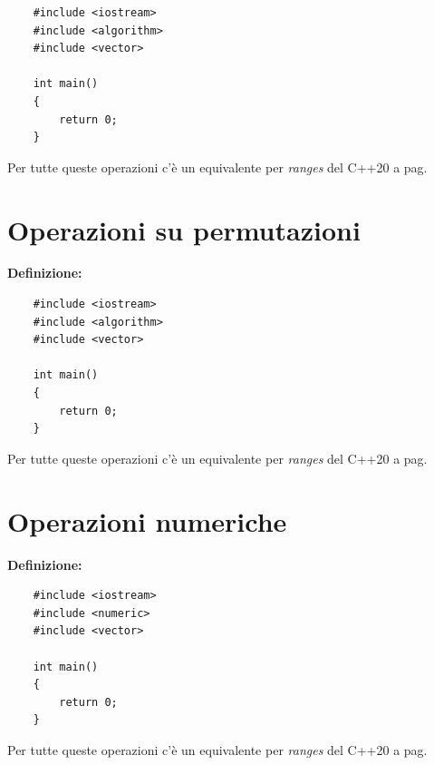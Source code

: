 \begin{lstlisting}
	#include <iostream>
	#include <algorithm>
	#include <vector>
	
	int main()
	{
		return 0;
	}
\end{lstlisting}

\fleuron

\textsf{\small Per tutte queste operazioni c'è un equivalente per \emph{ranges} del C++20 a pag. \pageref{ranges}} \\


\newpage

\section{Operazioni su permutazioni}

\textsf{\small \textbf{Definizione: } } \\

\begin{lstlisting}
	#include <iostream>
	#include <algorithm>
	#include <vector>
	
	int main()
	{
		return 0;
	}
\end{lstlisting}

\fleuron

\textsf{\small Per tutte queste operazioni c'è un equivalente per \emph{ranges} del C++20 a pag. \pageref{ranges}} \\


\newpage

\section{Operazioni numeriche}

\textsf{\small \textbf{Definizione: } } \\

\begin{lstlisting}
	#include <iostream>
	#include <numeric>
	#include <vector>
	
	int main()
	{
		return 0;
	}
\end{lstlisting}

\fleuron

\textsf{\small Per tutte queste operazioni c'è un equivalente per \emph{ranges} del C++20 a pag. \pageref{ranges}} \\

